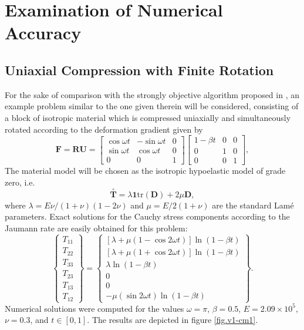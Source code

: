 \section{Examination of Numerical Accuracy}


\FloatBarrier
\subsection{Uniaxial Compression with Finite Rotation}
%
For the sake of comparison with the strongly objective algorithm proposed in \cite{rashid1993}, an example problem similar to the one given therein will be considered, consisting of a block of isotropic material which is compressed uniaxially and simultaneously rotated according to the deformation gradient given by
\begin{equation}
    \mathbf{F} = \mathbf{R} \mathbf{U} = \left[ \begin{array}{ccc} \cos \omega t & - \sin \omega t & 0 \\ \sin \omega t & \cos \omega t & 0 \\ 0 & 0 & 1 \end{array} \right] \left[ \begin{array}{ccc} 1 - \beta t & 0 & 0 \\ 0 & 1 & 0 \\ 0 & 0 & 1 \end{array} \right],
\end{equation}
The material model will be chosen as the isotropic hypoelastic model of grade zero, i.e.
\begin{equation}
    \overset{\circ}{\mathbf{T}} = \lambda \mathbf{1} \text{tr} (\mathbf{D}) + 2 \mu \mathbf{D},
\end{equation}
where $\lambda = E \nu / (1+\nu)(1-2\nu)$ and $\mu = E/2(1+\nu)$ are the standard Lam\'{e} parameters. Exact solutions for the Cauchy stress components according to the Jaumann rate are easily obtained for this problem:
\begin{equation}
  \left\{ \begin{array}{c} T_{11} \\ T_{22} \\ T_{33} \\ T_{23} \\ T_{13} \\ T_{12} \end{array} \right\} = \left\{ \begin{array}{c} \left[ \lambda + \mu (1 - \cos 2 \omega t) \right] \ln (1 - \beta t) \\ \left[ \lambda + \mu (1 + \cos 2 \omega t) \right] \ln (1-\beta t) \\ \lambda \ln (1-\beta t) \\ 0 \\ 0 \\ -\mu (\sin 2 \omega t) \ln (1-\beta t) \end{array} \right\}.
\end{equation}
Numerical solutions were computed for the values $\omega = \pi$, $\beta = 0.5$, $E = 2.09 \times 10^5$, $\nu = 0.3$, and $t \in \left[ 0, 1 \right]$. The results are depicted in figure \ref{fig.v1-cm1}.

